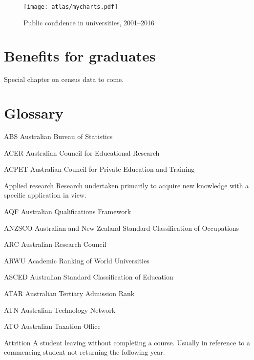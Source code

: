 \documentclass{grattan}
\begin{document}
    \begin{figure} %
    \caption{Public confidence in universities, 2001--2016}\label{fig:public-confidence-in-universities-20012016}
    \texttt{[image: atlas/mycharts.pdf]}
    \end{figure}



%
\chapter{Benefits for graduates }\label{chap:benefits-for-graduates}

Special chapter on census data to come.

%
\chapter{Glossary}\label{chap:glossary}

ABS Australian Bureau of Statistics

ACER Australian Council for Educational Research

ACPET Australian Council for Private Education and Training

Applied research Research undertaken primarily to acquire new knowledge with a specific application in view.

AQF Australian Qualifications Framework

ANZSCO Australian and New Zealand Standard Classification of Occupations

ARC Australian Research Council

ARWU Academic Ranking of World Universities

ASCED Australian Standard Classification of Education

ATAR Australian Tertiary Admission Rank

ATN Australian Technology Network

ATO Australian Taxation Office

Attrition A student leaving without completing a course. Usually in reference to a commencing student not returning the following year.
\end{document}
